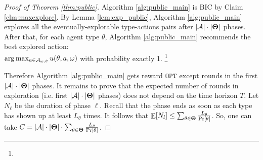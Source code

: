 \begin{proof}[Proof of Theorem \ref{thm:public}]
Algorithm \ref{alg:public_main} is BIC  by Claim \ref{clm:maxexplore}. By Lemma \ref{lem:exp_public}, Algorithm \ref{alg:public_main} explores all the eventually-explorable type-actions pairs after $|\mathcal{A}|\cdot |\bold{\Theta}|$ phases.
After that, for each agent type $\theta$, Algorithm \ref{alg:public_main} recommends the best explored action: \\$ \arg\max_{a \in \mathcal{A}_{\omega,\theta}} u(\theta, a, \omega)$ with probability exactly 1.%
\footnote{}

Therefore Algorithm \ref{alg:public_main} gets reward $\mathtt{OPT}$ except rounds in the first $|\mathcal{A}|\cdot |\bold{\Theta}|$ phases.  It remains to prove that the expected number of rounds in exploration (i.e. first $|\mathcal{A}|\cdot |\bold{\Theta}|$ phases) does not depend on the time horizon $T$. Let $N_\ell$ be the duration of phase $\ell$.
Recall that the phase ends as soon as each type has shown up at least $L_{\theta}$ times. It follows that
$ \mathop{\mathbb{E}}[N_l] \leq  \sum_{\theta\in\bold{\Theta}} \frac{L_{\theta}}{\Pr[\theta]}$.
So, one can take $C = |\mathcal{A}|\cdot |\bold{\Theta}|\cdot \sum_{\theta\in\bold{\Theta}} \frac{L_{\theta}}{\Pr[\theta]}$.
\end{proof}

